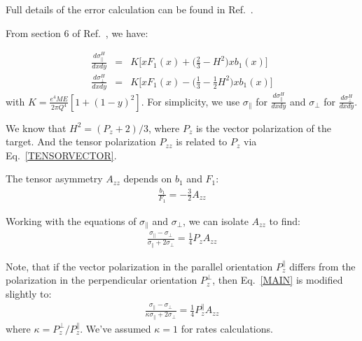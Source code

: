 \label{APPERR}
Full details of the error calculation can be found in Ref.~\cite{SOLVI}.

From section 6 of Ref.~\cite{Hoodbhoy:1988am},
we have:


\begin{eqnarray}
\frac{d\sigma_{\parallel}^H}{dxdy} & = & K \Bigg[x F_1(x) + \Big(\frac{2}{3} - H^2\Big) x b_1(x) \Bigg]\\
\frac{d\sigma_{\perp}^H}{dxdy}    & = & K \Bigg[x F_1(x) - \Big(\frac{1}{3} - \frac{1}{2}H^2\Big) x b_1(x) \Bigg]
\label{xs} 
\end{eqnarray}
%
with $K = \frac{e^4 M E}{2 \pi Q^4} [1+(1-y)^2]$.
%
For simplicity, we use $\sigma_{\parallel}$ for $\frac{d\sigma_{\parallel}^H}{dxdy}$ and $\sigma_{\perp}$ for $\frac{d\sigma_{\perp}^H}{dxdy}$.

We know that $H^2 = (P_z+2)/3$, where $P_z$ is the vector polarization of the target. 
%
And the tensor polarization $P_{zz}$ is related to $P_z$ via Eq.~\ref{TENSORVECTOR}.

The tensor asymmetry $A_{zz}$ depends on $b_1$ and $F_1$:
\begin{eqnarray}
\frac{b_1}{F_1} = - \frac{3}{2} A_{zz}
\label{none} 
\end{eqnarray}


Working with the equations of $\sigma_{\parallel}$ and $\sigma_{\perp}$, we can isolate $A_{zz}$ to find: 
\begin{eqnarray}
\frac{\sigma_{\parallel} - \sigma_{\perp}}{\sigma_{\parallel} + 2 \sigma_{\perp}} = \frac{1}{4} P_z A_{zz}
\label{MAIN} 
\end{eqnarray}

Note, that if the vector polarization in the parallel orientation $P_z^\parallel$
differs from the polarization in the perpendicular orientation
$P_z^\perp$, then Eq.~\ref{MAIN} is modified slightly to:
\begin{eqnarray*}
\frac{\sigma_{\parallel} - \sigma_{\perp}}{\kappa\sigma_{\parallel} + 2 \sigma_{\perp}} = \frac{1}{4} P_z^\parallel A_{zz}
\end{eqnarray*}
where $\kappa={P_z^\perp}/{P_z^\parallel}$.   We've assumed $\kappa=1$ for rates calculations.



